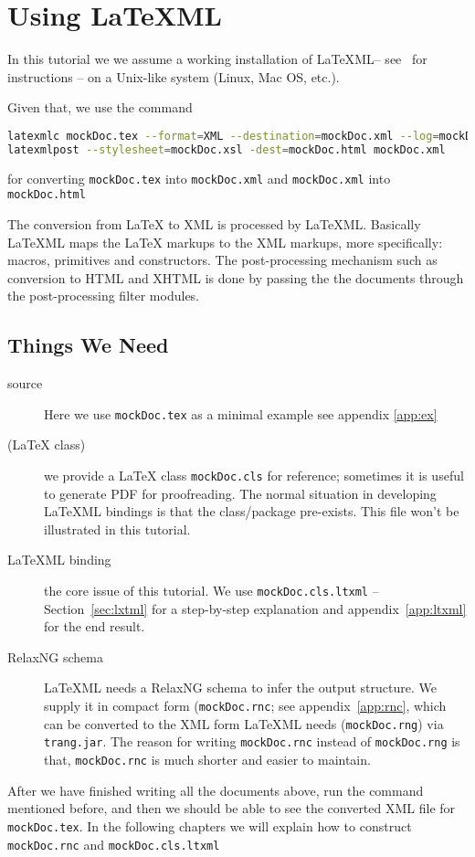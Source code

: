 \documentclass[a4paper]{article}
\def\latexml{{\LaTeX}ML\xspace}
\begin{document}
\section{Using LaTeXML}\label{sec:using}

In this tutorial we we assume a working installation of \latexml -- see~\cite{LaTeXML:get}
for instructions -- on a Unix-like system (Linux, Mac OS, etc.). 

 Given that, we use the
command
\begin{lstlisting}[language=bash]
latexmlc mockDoc.tex --format=XML --destination=mockDoc.xml --log=mockDoc.xml.log
latexmlpost --stylesheet=mockDoc.xsl -dest=mockDoc.html mockDoc.xml 
\end{lstlisting}
for converting \lstinline|mockDoc.tex| into \lstinline|mockDoc.xml| and \lstinline|mockDoc.xml| into
\lstinline|mockDoc.html|


The conversion from {\LaTeX} to XML is processed by \latexml. Basically \latexml maps the
{\LaTeX} markups to the XML markups, more specifically: macros, primitives and
constructors. The post-processing mechanism such as conversion to HTML and XHTML is done by 
passing the the documents through the post-processing filter modules.

\subsection{Things We Need}
\begin{description}
\item[source] Here we use \lstinline|mockDoc.tex| as a minimal example see appendix \ref{app:ex} \item[({\LaTeX} class)] we provide a {\LaTeX} class \lstinline|mockDoc.cls| for reference; sometimes it is useful to generate PDF for proofreading. The  normal situation in
  developing \latexml bindings is that the class/package pre-exists. This file won't be
  illustrated in this tutorial. 
\item[\latexml binding] the core issue of this tutorial. We use \lstinline|mockDoc.cls.ltxml|
  -- Section~\ref{sec:lxtml} for a step-by-step explanation and appendix~\ref{app:ltxml}
  for the end result.
\item[RelaxNG schema] \latexml needs a RelaxNG schema to infer the output structure. We
  supply it in compact form (\lstinline|mockDoc.rnc|; see appendix~\ref{app:rnc}, which
  can be converted to the XML form \latexml needs (\lstinline|mockDoc.rng|) via
  \lstinline|trang.jar|.  The reason for writing \lstinline|mockDoc.rnc| instead of
  \lstinline|mockDoc.rng| is that, \lstinline|mockDoc.rnc| is much shorter and easier to
  maintain. 
\end{description}
After we have finished writing all the documents above, run the command mentioned before,
and then we should be able to see the converted XML file for \lstinline|mockDoc.tex|. In
the following chapters we will explain how to construct \lstinline|mockDoc.rnc| and
\lstinline|mockDoc.cls.ltxml|
\end{document}
